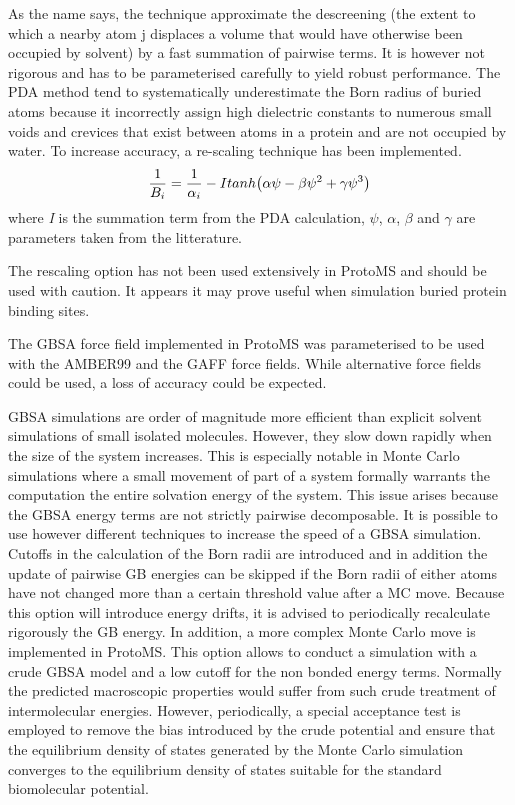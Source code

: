 \documentclass[letterpaper,10pt,english]{sphinxmanual}
\begin{document}
As the name says, the technique approximate the descreening (the extent to which a nearby atom j displaces a volume that would have otherwise been occupied by solvent) by a fast summation of pairwise terms. It is however not rigorous and has to be parameterised carefully to yield robust performance. The PDA method tend to systematically underestimate the Born radius of buried atoms because it incorrectly assign high dielectric constants to numerous small voids and crevices that exist between atoms in a protein and are not occupied by water. To increase accuracy, a re-scaling technique has been implemented.
\begin{gather}
\begin{split}{\frac{1}{B_i}}  = \frac{1}{\alpha _{i}} - Itanh\big( \alpha \psi - \beta \psi^{2} + \gamma \psi^{3}  \big)\end{split}\notag
\end{gather}
where \emph{I} is the summation term from the PDA calculation, \(\psi\), \(\alpha\), \(\beta\) and \(\gamma\) are parameters taken from the litterature.

The rescaling option has not been used extensively in ProtoMS and should be used with caution. It appears it may prove useful when simulation buried protein binding sites.

The GBSA force field implemented in ProtoMS was parameterised to be used with the AMBER99 and the GAFF force fields. While alternative force fields could be used, a loss of accuracy could be expected.

GBSA simulations are order of magnitude more efficient than explicit solvent simulations of small isolated molecules. However, they slow
down rapidly when the size of the system increases. This is especially notable in Monte Carlo simulations where a small movement of part of a system formally warrants the computation the entire solvation energy of the system. This issue arises because the GBSA energy terms are not strictly pairwise decomposable.  It is possible to use however different techniques to increase the speed of a GBSA simulation. Cutoffs in the calculation of the Born radii are introduced and in addition the update of pairwise GB energies can be skipped if the Born radii of either atoms have not changed more than a certain threshold value after a MC move. Because this option will introduce energy drifts, it is advised to periodically recalculate rigorously the GB energy. In addition, a more complex Monte Carlo move is implemented in ProtoMS. This option allows to conduct a simulation with a crude GBSA model and a low cutoff for the non bonded energy terms. Normally the  predicted macroscopic properties would suffer from such crude treatment of intermolecular energies. However, periodically, a special acceptance test is employed to remove the bias introduced by the crude potential and ensure that the equilibrium density of states generated by the Monte Carlo simulation converges to the equilibrium density of states suitable for the standard biomolecular potential.
\end{document}
